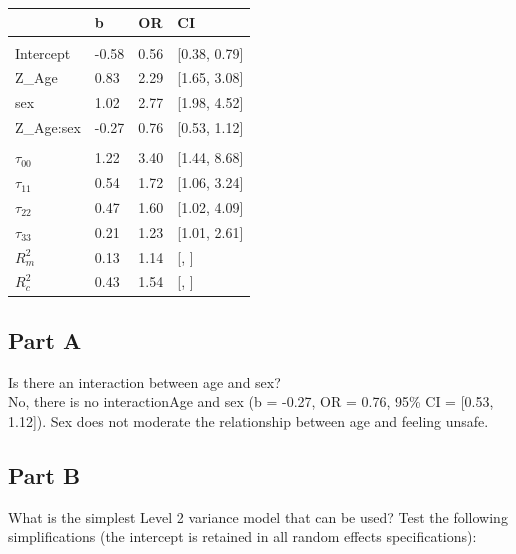 \documentclass[]{article}
\begin{document}
\begin{table}[H]
\centering
\begin{tabular}{llll}
\toprule
 & b & OR & CI\\
\midrule
\addlinespace[0.3em]
\multicolumn{4}{l}{\textbf{Fixed}}\\
\hspace{1em}Intercept & -0.58 & 0.56 & [0.38, 0.79]\\
\hspace{1em}Z\_Age & 0.83 & 2.29 & [1.65, 3.08]\\
\hspace{1em}sex & 1.02 & 2.77 & [1.98, 4.52]\\
\hspace{1em}Z\_Age:sex & -0.27 & 0.76 & [0.53, 1.12]\\
\addlinespace[0.3em]
\multicolumn{4}{l}{\textbf{Random}}\\
\hspace{1em}$\tau_{00}$ & 1.22 & 3.40 & [1.44, 8.68]\\
\hspace{1em}$\tau_{11}$ & 0.54 & 1.72 & [1.06, 3.24]\\
\hspace{1em}$\tau_{22}$ & 0.47 & 1.60 & [1.02, 4.09]\\
\hspace{1em}$\tau_{33}$ & 0.21 & 1.23 & [1.01, 2.61]\\
$R^2_m$ & 0.13 & 1.14 & [, ]\\
$R^2_c$ & 0.43 & 1.54 & [, ]\\
\bottomrule
\end{tabular}
\end{table}

\subsection{Part A}\label{part-a-1}

Is there an interaction between age and sex?\\
No, there is no interactionAge and sex (b = -0.27, OR = 0.76, 95\% CI =
{[}0.53, 1.12{]}). Sex does not moderate the relationship between age
and feeling unsafe.

\subsection{Part B}\label{part-b-1}

What is the simplest Level 2 variance model that can be used? Test the
following simplifications (the intercept is retained in all random
effects specifications):
\end{document}
